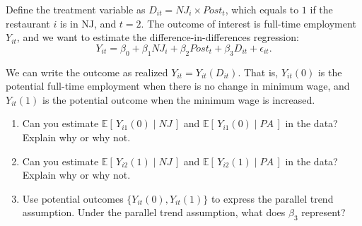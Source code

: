 \documentclass[12pt]{article}
\begin{document}
Define the treatment variable as $D_{it}=NJ_i \times Post_t$, which equals to $1$ if the restaurant $i$ is in NJ, and $t=2$. The outcome of interest is full-time employment $Y_{it}$, and we want to estimate the difference-in-differences regression:
\[
  Y_{it}=\beta_0+\beta_1 NJ_i+\beta_2 Post_t+\beta_3 D_{it}+\epsilon_{it}.
\]

We can write the outcome as realized $Y_{it}=Y_{it}(D_{it})$. That is, $Y_{it}(0)$ is the potential full-time employment when there is no change in minimum wage, and $Y_{it}(1)$ is the potential outcome when the minimum wage is increased.

\begin{enumerate}[label=\textbf{(\alph*)}, leftmargin=1.5em]
  \item Can you estimate $\mathbb{E}[\,Y_{i1}(0)\mid NJ\,]$ and $\mathbb{E}[\,Y_{i1}(0)\mid PA\,]$ in the data? Explain why or why not.\\[0.5em]
\newpage
  \item Can you estimate $\mathbb{E}[\,Y_{i2}(1)\mid NJ\,]$ and $\mathbb{E}[\,Y_{i2}(1)\mid PA\,]$ in the data? Explain why or why not.\\[0.5em]
\newpage
  \item Use potential outcomes $\{Y_{it}(0),Y_{it}(1)\}$ to express the parallel trend assumption. Under the parallel trend assumption, what does $\beta_3$ represent?\\[0.5em]
  \newpage
\end{enumerate}
\end{document}
